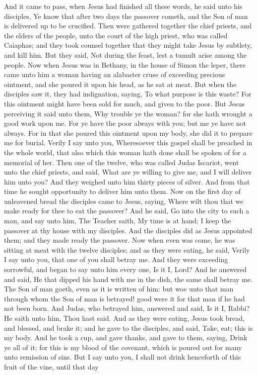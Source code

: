 And it came to pass, when Jesus had finished all these words, he said unto his disciples, Ye know that after two days the passover cometh, and the Son of man is delivered up to be crucified. Then were gathered together the chief priests, and the elders of the people, unto the court of the high priest, who was called Caiaphas; and they took counsel together that they might take Jesus by subtlety, and kill him. But they said, Not during the feast, lest a tumult arise among the people.  Now when Jesus was in Bethany, in the house of Simon the leper, there came unto him a woman having an alabaster cruse of exceeding precious ointment, and she poured it upon his head, as he sat at meat. But when the disciples saw it, they had indignation, saying, To what purpose is this waste? For this ointment might have been sold for much, and given to the poor. But Jesus perceiving it said unto them, Why trouble ye the woman? for she hath wrought a good work upon me. For ye have the poor always with you; but me ye have not always. For in that she poured this ointment upon my body, she did it to prepare me for burial. Verily I say unto you, Wheresoever this gospel shall be preached in the whole world, that also which this woman hath done shall be spoken of for a memorial of her.  Then one of the twelve, who was called Judas Iscariot, went unto the chief priests, and said, What are ye willing to give me, and I will deliver him unto you? And they weighed unto him thirty pieces of silver. And from that time he sought opportunity to deliver him unto them.  Now on the first day of unleavened bread the disciples came to Jesus, saying, Where wilt thou that we make ready for thee to eat the passover? And he said, Go into the city to such a man, and say unto him, The Teacher saith, My time is at hand; I keep the passover at thy house with my disciples. And the disciples did as Jesus appointed them; and they made ready the passover.  Now when even was come, he was sitting at meat with the twelve disciples; and as they were eating, he said, Verily I say unto you, that one of you shall betray me. And they were exceeding sorrowful, and began to say unto him every one, Is it I, Lord? And he answered and said, He that dipped his hand with me in the dish, the same shall betray me. The Son of man goeth, even as it is written of him: but woe unto that man through whom the Son of man is betrayed! good were it for that man if he had not been born. And Judas, who betrayed him, answered and said, Is it I, Rabbi? He saith unto him, Thou hast said.  And as they were eating, Jesus took bread, and blessed, and brake it; and he gave to the disciples, and said, Take, eat; this is my body. And he took a cup, and gave thanks, and gave to them, saying, Drink ye all of it; for this is my blood of the covenant, which is poured out for many unto remission of sins. But I say unto you, I shall not drink henceforth of this fruit of the vine, until that day 